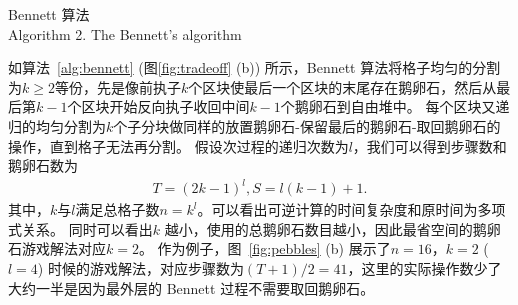 \documentclass[A4,twoside,UTF8]{ctexart}
\begin{document}
\begin{algorithm}
    \SetAlgoLined
    \DontPrintSemicolon
    \caption{Bennett 算法\\ Algorithm 2. The Bennett's algorithm}\label{alg:bennett}
\end{algorithm}
如算法~\ref{alg:bennett} (图\ref{fig:tradeoff} (b)) 所示，Bennett 算法将格子均匀的分割为$k\geq 2$等份，先是像前执子$k$个区块使最后一个区块的末尾存在鹅卵石，然后从最后第$k-1$个区块开始反向执子收回中间$k-1$个鹅卵石到自由堆中。
每个区块又递归的均匀分割为$k$个子分块做同样的放置鹅卵石-保留最后的鹅卵石-取回鹅卵石的操作，直到格子无法再分割。
假设次过程的递归次数为$l$，我们可以得到步骤数和鹅卵石数为
\begin{align}\label{eq:rev}
    T = (2k-1)^l, S = l(k-1)+1.
\end{align}
其中，$k$与$l$满足总格子数$n = k^l$。可以看出可逆计算的时间复杂度和原时间为多项式关系。
同时可以看出$k$ 越小，使用的总鹅卵石数目越小，因此最省空间的鹅卵石游戏解法对应$k=2$。
作为例子，图~\ref{fig:pebbles} (b) 展示了$n=16$，$k=2$ ($l=4$) 时候的游戏解法，对应步骤数为$(T+1)/2 = 41$，这里的实际操作数少了大约一半是因为最外层的 Bennett 过程不需要取回鹅卵石。
\end{document}
